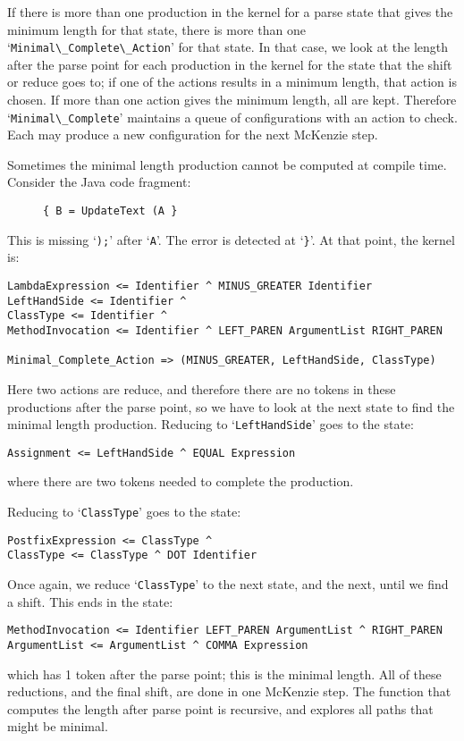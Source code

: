 \documentclass[authordraft]{acmart}
\newcommand{\code}[1]{`\lstinline|#1|'}
\begin{document}
If there is more than one production in the kernel for a parse state
that gives the minimum length for that state, there is more than one\\
\code{Minimal\_Complete\_Action} for that state. In that case, we look
at the length after the parse point for each production in the kernel
for the state that the shift or reduce goes to; if one of the actions
results in a minimum length, that action is chosen. If more than one
action gives the minimum length, all are kept. Therefore
\code{Minimal\_Complete} maintains a queue of configurations with an
action to check. Each may produce a new configuration for the next
McKenzie step.

Sometimes the minimal length production cannot be computed at compile
time. Consider the Java code fragment:
\begin{figure}[H]
  \small{
    \begin{lstlisting}
{ B = UpdateText (A }
    \end{lstlisting}
    }
\caption{}
\label{ex:recursive_length_after_dot}
\end{figure}
This is missing \code{);} after \code{A}. The error is detected at
`\lstinline|}|'. At that point, the kernel is:
\begin{verbatim}
LambdaExpression <= Identifier ^ MINUS_GREATER Identifier
LeftHandSide <= Identifier ^
ClassType <= Identifier ^
MethodInvocation <= Identifier ^ LEFT_PAREN ArgumentList RIGHT_PAREN

Minimal_Complete_Action => (MINUS_GREATER, LeftHandSide, ClassType)
\end{verbatim}
Here two actions are reduce, and therefore there are no tokens in
these productions after the parse point, so we have to look at the
next state to find the minimal length production. Reducing to
\code{LeftHandSide} goes to the state:
\begin{verbatim}
Assignment <= LeftHandSide ^ EQUAL Expression
\end{verbatim}
where there are two tokens needed to complete the production.

Reducing to \code{ClassType} goes to the state:
\begin{verbatim}
PostfixExpression <= ClassType ^
ClassType <= ClassType ^ DOT Identifier
\end{verbatim}
Once again, we reduce \code{ClassType} to the next state, and the
next, until we find a shift. This ends in the state:
\begin{verbatim}
MethodInvocation <= Identifier LEFT_PAREN ArgumentList ^ RIGHT_PAREN
ArgumentList <= ArgumentList ^ COMMA Expression
\end{verbatim}
which has 1 token after the parse point; this is the minimal length.
All of these reductions, and the final shift, are done in one McKenzie
step. The function that computes the length after parse point is
recursive, and explores all paths that might be minimal.
\end{document}
